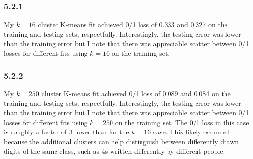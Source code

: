 \documentclass[12pt]{amsart}
\begin{document}
\subsubsection*{5.2.1}

My $k = 16$ cluster K-means fit achieved 0/1 loss of 0.333 and 0.327 on the training and testing sets, respectfully.  Interestingly, the testing error was lower than the training error but I note that there was appreciable scatter between 0/1 losses for different fits using $k = 16$ on the training set.

\subsubsection*{5.2.2}

My $k = 250$ cluster K-means fit achieved 0/1 loss of 0.089 and 0.084 on the training and testing sets, respectfully.  Interestingly, the testing error was lower than the training error but I note that there was appreciable scatter between 0/1 losses for different fits using $k = 250$ on the training set.  The 0/1 loss in this case is roughly a factor of 3 lower than for the $k = 16$ case.  This likely occurred because the additional clusters can help distinguish between differently drawn digits of the same class, such as 4s written differently by different people.
\end{document}
